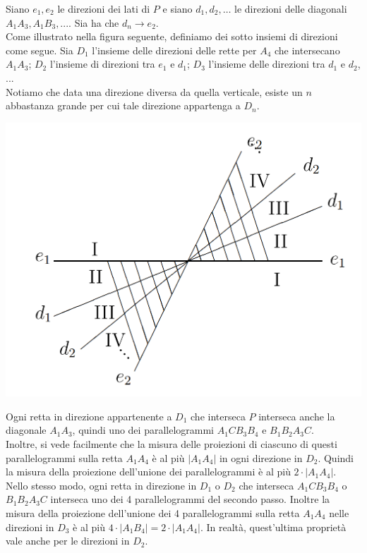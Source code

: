\documentclass[a4paper, twoside,openright]{article}
\newcommand{\<}{\langle}
\renewcommand{\>}{\rangle}
\begin{document}
Siano $e_{1}, e_{2}$ le direzioni dei lati di $P$ e siano $d_{1}, d_{2}, \ldots$ le direzioni delle diagonali $A_{1} A_{3}, A_{1} B_{3},...$. Sia ha che $d_{n} \rightarrow e_{2}$.\\
Come illustrato nella figura seguente, definiamo dei sotto insiemi di direzioni come segue. Sia $D_1$ l'insieme delle direzioni delle rette per $A_{4}$ che intersecano $A_{1} A_{3}$; $D_2$ l'insieme di direzioni tra $e_{1}$ e $d_{1}$; $D_3$ l'insieme delle direzioni tra $d_{1}$ e $d_{2}$, ...\\
Notiamo che data una direzione diversa da quella verticale, esiste un $n$ abbastanza grande per cui tale direzione appartenga a $D_n$.

\begin{center}
	\includegraphics[width=0.6\columnwidth]{direzioni.png}
\end{center}

Ogni retta in direzione appartenente a $D_1$ che interseca $P$ interseca anche la diagonale $A_{1} A_{3}$, quindi uno dei parallelogrammi $A_{1} C B_{3} B_{4}$ e $B_{1} B_{2} A_{3} C$.\\
Inoltre, si vede facilmente che la misura delle proiezioni di ciascuno di questi parallelogrammi sulla retta $A_{1} A_{4}$ è al più $\left|A_{1} A_{4}\right|$ in ogni direzione in $D_2$. Quindi la misura della proiezione dell'unione dei parallelogrammi è al più $2 \cdot\left|A_{1} A_{4}\right|$.\\
Nello stesso modo, ogni retta in direzione in $D_1$ o $D_2$ che interseca $A_{1} C B_{3} B_{4}$ o $B_{1} B_{2} A_{3} C$ interseca uno dei 4 parallelogrammi del secondo passo. Inoltre la misura della proiezione dell'unione dei 4 parallelogrammi sulla retta $A_{1} A_{4}$ nelle direzioni in $D_3$ è al più $4 \cdot\left|A_{1} B_{4}\right|=2 \cdot\left|A_{1} A_{4}\right|$. In realtà, quest'ultima proprietà vale anche per le direzioni in $D_2$.\\
\end{document}
